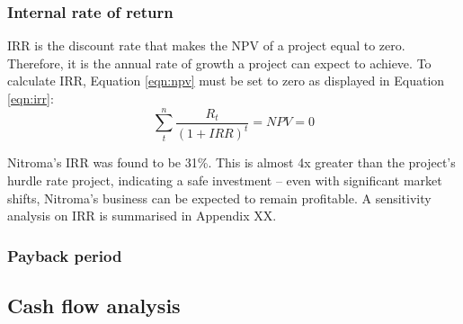\subsubsection{Internal rate of return}
IRR is the discount rate that makes the NPV of a project equal to zero. Therefore, it is the annual rate of growth a project can expect to achieve. To calculate IRR, Equation \ref{eqn:npv} must be set to zero as displayed in Equation \ref{eqn:irr}:
\begin{equation}
\label{eqn:irr}
    \sum_t^n\frac{R_{t}}{(1+IRR)^{t}}=NPV=0
\end{equation}

Nitroma’s IRR was found to be 31\%. This is almost 4x greater than the project’s hurdle rate project, indicating a safe investment – even with significant market shifts, Nitroma’s business can be expected to remain profitable. A sensitivity analysis on IRR is summarised in Appendix XX.


\subsubsection{Payback period}




\subsection{Cash flow analysis}
